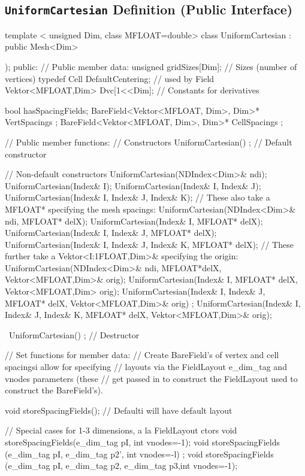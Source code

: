 \subsection{\texttt{UniformCartesian} Definition (Public Interface)}
\begin{smallcode}
template < unsigned Dim, class MFLOAT=double>
class UniformCartesian : public Mesh<Dim>
{ );
public: 
// Public member data: 
unsigned gridSizes[Dim];            // Sizes (number of vertices) 
typedef Cell DefaultCentering;   // used by Field
Vektor<MFLOAT,Dim>  Dvc[1<<Dim];  // Constants for derivatives 

bool hasSpacingFields;  	          
BareField<Vektor<MFLOAT, Dim>, Dim>* VertSpacings ;
BareField<Vektor<MFLOAT, Dim>, Dim>* CellSpacings ;

// Public member functions: 
// Constructors 
UniformCartesian() {}; // Default constructor 

// Non-default constructors 
UniformCartesian(NDIndex<Dim>& ndi); 
UniformCartesian(Index& I); 
UniformCartesian(Index& I, Index& J); 
UniformCartesian(Index& I, Index& J, Index& K); 
// These also take a MFLOAT* specifying the mesh spacings: 
UniformCartesian(NDIndex<Dim>& ndi, MFLOAT* delX); 
UniformCartesian(Index& I, MFLOAT* delX); 
UniformCartesian(Index& I, Index& J, MFLOAT* delX); 
UniformCartesian(Index& I, Index& J, Index& K, MFLOAT* delX); 
// These further take a Vektor<I:1FLOAT,Dim>& specifying the origin: 
UniformCartesian(NDIndex<Dim>& ndi, MFLOAT*delX, Vektor<MFLOAT,Dim>& orig); 
UniformCartesian(Index& I, MFLOAT* delX, Vektor<MFLOAT,Dim> orig); 
UniformCartesian(Index& I, Index& J, MFLOAT* delX, Vektor<MFLOAT,Dim>& orig) ;
UniformCartesian(Index& I, Index& J, Index& K, MFLOAT* delX, Vektor<MFLOAT,Dim>& orig); 

~UniformCartesian() { }; // Destructor 

// Set functions for member data: 
// Create BareField's of vertex and cell spacingsi allow for specifying 
// layouts via the FieldLayout e_dim_tag and vnodes parameters (these 
// get passed in to construct the FieldLayout used to construct the BareField's).
 
void storeSpacingFields(); // Defaulti will have default layout 

// Special cases for 1-3 dimensions, a la FieldLayout ctors
void storeSpacingFields(e_dim_tag pI, int vnodes=-1);
void storeSpacingFields (e_dim_tag pI, e_dim_tag p2', int vnodes=-l) ; 
void storeSpacingFields (e_dim_tag pI, e_dim_tag p2, e_dim_tag p3,int vnodes=-1); 

}
\end{smallcode}
